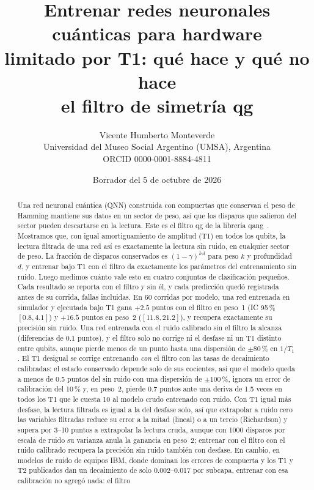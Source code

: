 \documentclass[11pt]{article}
\title{Entrenar redes neuronales cuánticas para hardware\\ limitado por T1: qué hace y qué no hace\\ el filtro de simetría qg}
\author{Vicente Humberto Monteverde\\
\small Universidad del Museo Social Argentino (UMSA), Argentina\\
\small ORCID 0000-0001-8884-4811}
\date{\small Borrador del 5 de octubre de 2026}
\begin{document}
\sloppy
\maketitle

\begin{abstract}
Una red neuronal cuántica (QNN) construida con compuertas que conservan el peso de Hamming mantiene sus datos
en un sector de peso, así que los disparos que salieron del sector pueden descartarse en la lectura. Este es el
filtro qg de la librería qang~\cite{monteverde2026qang,monteverde2026witness}. Mostramos que, con igual
amortiguamiento de amplitud (T1) en todos los qubits, la lectura filtrada de una red así es exactamente la
lectura sin ruido, en cualquier sector de peso. La fracción de disparos conservados es $(1-\gamma)^{k\,d}$ para
peso $k$ y profundidad $d$, y entrenar bajo T1 con el filtro da exactamente los parámetros del entrenamiento sin
ruido. Luego medimos cuánto vale esto en cuatro conjuntos de clasificación pequeños. Cada resultado se reporta
con el filtro y sin él, y cada predicción quedó registrada antes de su corrida, fallas incluidas. En 60 corridas
por modelo, una red entrenada en simulador y ejecutada bajo T1 gana $+2.5$ puntos con el filtro en peso~1
(IC 95\,\% $[0.8,4.1]$) y $+16.5$ puntos en peso~2 ($[11.8,21.2]$), y recupera exactamente su precisión sin
ruido. Una red entrenada con el ruido calibrado sin el filtro la alcanza (diferencias de $0.1$ puntos), y el
filtro solo no corrige ni el desfase ni un T1 distinto entre qubits, aunque pierde menos de un punto hasta
una dispersión de $\pm80\,\%$ en $1/T_1$. El T1 desigual se corrige entrenando \emph{con} el filtro con las tasas de
decaimiento calibradas: el estado conservado depende solo de sus cocientes, así que el modelo queda a menos de 0.5
puntos del sin ruido con una dispersión de $\pm100\,\%$, ignora un error de calibración del 10\,\% y, en peso~2,
pierde 0.7 puntos ante una deriva de 1.5 veces en todos los T1 que le cuesta 10 al modelo crudo entrenado con ruido. Con T1 igual más desfase, la lectura filtrada es igual a la del
desfase solo, así que extrapolar a ruido cero las variables filtradas reduce su error a la mitad (lineal) o a un tercio
(Richardson) y supera por 3--10 puntos a extrapolar la lectura cruda, aunque con 1000 disparos por escala de ruido su
varianza anula la ganancia en peso~2; entrenar con el filtro con el ruido calibrado recupera la precisión sin ruido
también con desfase. En cambio, en modelos de ruido de equipos IBM, donde dominan los errores de compuerta y los T1 y T2
publicados dan un decaimiento de solo 0.002--0.017 por subcapa, entrenar con esa calibración no agregó nada: el filtro

\end{abstract}
\end{document}
